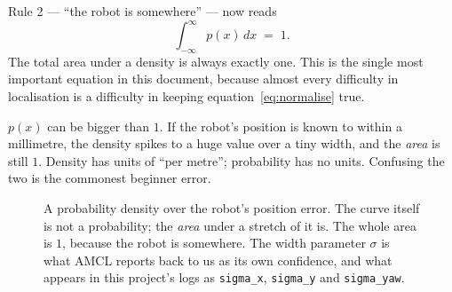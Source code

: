 \documentclass[11pt,a4paper]{report}
\newcommand{\file}[1]{\texttt{\small #1}}
\begin{document}
Rule 2 --- ``the robot is somewhere'' --- now reads
\begin{equation}
\int_{-\infty}^{\infty} p(x)\, dx \;=\; 1 .
\label{eq:normalise}
\end{equation}
The total area under a density is always exactly one. This is the single most
important equation in this document, because almost every difficulty in
localisation is a difficulty in keeping equation~\eqref{eq:normalise} true.

\begin{warnbox}
$p(x)$ can be bigger than $1$. If the robot's position is known to within a
millimetre, the density spikes to a huge value over a tiny width, and the
\emph{area} is still $1$. Density has units of ``per metre''; probability has no
units. Confusing the two is the commonest beginner error.
\end{warnbox}

\begin{figure}[htbp]
\centering
{}
\caption[A probability density]{A probability density over the robot's
position error. The curve itself is not a probability; the \emph{area} under a
stretch of it is. The whole area is $1$, because the robot is somewhere. The
width parameter $\sigma$ is what AMCL reports back to us as its own confidence,
and what appears in this project's logs as \file{sigma\_x}, \file{sigma\_y} and
\file{sigma\_yaw}.}
\label{fig:density}
\end{figure}
\end{document}
